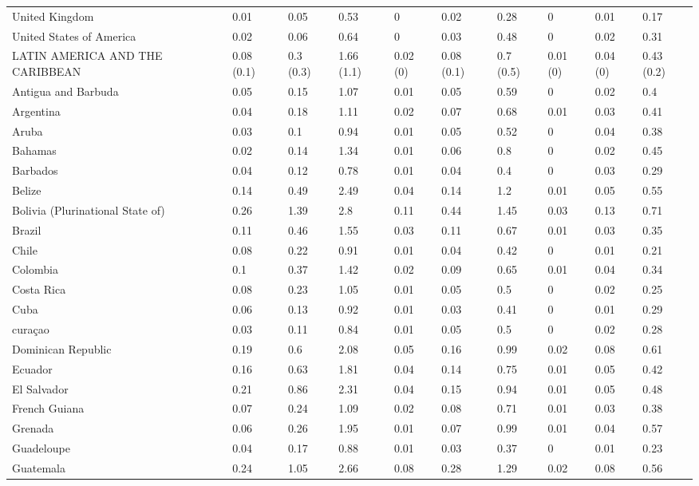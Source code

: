 \begin{longtable}[t]{llllllllll}
United Kingdom & 0.01 & 0.05 & 0.53 & 0 & 0.02 & 0.28 & 0 & 0.01 & 0.17\\
United States of America & 0.02 & 0.06 & 0.64 & 0 & 0.03 & 0.48 & 0 & 0.02 & 0.31\\
LATIN AMERICA AND THE CARIBBEAN & 0.08 (0.1) & 0.3 (0.3) & 1.66 (1.1) & 0.02 (0) & 0.08 (0.1) & 0.7 (0.5) & 0.01 (0) & 0.04 (0) & 0.43 (0.2)\\
Antigua and Barbuda & 0.05 & 0.15 & 1.07 & 0.01 & 0.05 & 0.59 & 0 & 0.02 & 0.4\\
Argentina & 0.04 & 0.18 & 1.11 & 0.02 & 0.07 & 0.68 & 0.01 & 0.03 & 0.41\\
Aruba & 0.03 & 0.1 & 0.94 & 0.01 & 0.05 & 0.52 & 0 & 0.04 & 0.38\\
Bahamas & 0.02 & 0.14 & 1.34 & 0.01 & 0.06 & 0.8 & 0 & 0.02 & 0.45\\
Barbados & 0.04 & 0.12 & 0.78 & 0.01 & 0.04 & 0.4 & 0 & 0.03 & 0.29\\
Belize & 0.14 & 0.49 & 2.49 & 0.04 & 0.14 & 1.2 & 0.01 & 0.05 & 0.55\\
Bolivia (Plurinational State of) & 0.26 & 1.39 & 2.8 & 0.11 & 0.44 & 1.45 & 0.03 & 0.13 & 0.71\\
Brazil & 0.11 & 0.46 & 1.55 & 0.03 & 0.11 & 0.67 & 0.01 & 0.03 & 0.35\\
Chile & 0.08 & 0.22 & 0.91 & 0.01 & 0.04 & 0.42 & 0 & 0.01 & 0.21\\
Colombia & 0.1 & 0.37 & 1.42 & 0.02 & 0.09 & 0.65 & 0.01 & 0.04 & 0.34\\
Costa Rica & 0.08 & 0.23 & 1.05 & 0.01 & 0.05 & 0.5 & 0 & 0.02 & 0.25\\
Cuba & 0.06 & 0.13 & 0.92 & 0.01 & 0.03 & 0.41 & 0 & 0.01 & 0.29\\
curaçao & 0.03 & 0.11 & 0.84 & 0.01 & 0.05 & 0.5 & 0 & 0.02 & 0.28\\
Dominican Republic & 0.19 & 0.6 & 2.08 & 0.05 & 0.16 & 0.99 & 0.02 & 0.08 & 0.61\\
Ecuador & 0.16 & 0.63 & 1.81 & 0.04 & 0.14 & 0.75 & 0.01 & 0.05 & 0.42\\
El Salvador & 0.21 & 0.86 & 2.31 & 0.04 & 0.15 & 0.94 & 0.01 & 0.05 & 0.48\\
French Guiana & 0.07 & 0.24 & 1.09 & 0.02 & 0.08 & 0.71 & 0.01 & 0.03 & 0.38\\
Grenada & 0.06 & 0.26 & 1.95 & 0.01 & 0.07 & 0.99 & 0.01 & 0.04 & 0.57\\
Guadeloupe & 0.04 & 0.17 & 0.88 & 0.01 & 0.03 & 0.37 & 0 & 0.01 & 0.23\\
Guatemala & 0.24 & 1.05 & 2.66 & 0.08 & 0.28 & 1.29 & 0.02 & 0.08 & 0.56\\

\end{longtable}
